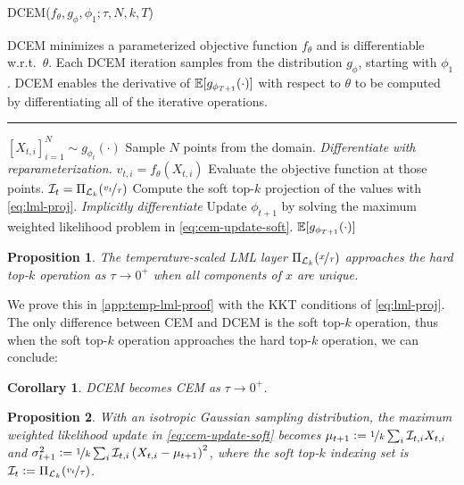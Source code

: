 \documentclass{article}
\newtheorem{proposition}{Proposition}
\newtheorem{corollary}{Corollary}
\newcommand{\LML}{\ensuremath{\mathcal{L}}}
\begin{document}
\begin{algorithm*}[t]
  \caption{DCEM($f_\theta, g_\phi, \phi_1; \tau, N, k, T$)}
\label{alg:dcem}
\begin{algorithmic}
  \State DCEM minimizes a parameterized objective function $f_\theta$
  and is differentiable w.r.t.~$\theta$.
  Each DCEM iteration samples from the distribution $g_\phi$,
  starting with $\phi_1$.
  DCEM enables the derivative of $\mathbb{E}[g_{\phi_{T+1}}(\cdot)]$
  with respect to $\theta$ to be computed by differentiating
  all of the iterative operations.
  \vspace{1mm}\hrule\vspace{1mm}
  \State $\left[X_{t,i}\right]_{i=1}^N \sim g_{\phi_t}(\cdot)$
  \Comment Sample $N$ points from the domain. \emph{Differentiate with reparameterization.}
  \State $v_{t,i}=f_\theta(X_{t,i})$
  \Comment Evaluate the objective function at those points.
  \State $\gI_t = \Pi_{\LML_k}(\nicefrac{v_t}{\tau})$
  \Comment Compute the soft top-$k$ projection of the values with \cref{eq:lml-proj}. \emph{Implicitly differentiate}
  \State Update $\phi_{t+1}$ by solving the maximum weighted likelihood problem in \cref{eq:cem-update-soft}.
  \EndFor
  \State \Return $\mathbb{E}[g_{\phi_{T+1}}(\cdot)]$
\end{algorithmic}
\end{algorithm*}

\begin{proposition}
  The temperature-scaled LML layer $\Pi_{\LML_k}(\nicefrac{x}{\tau})$
  approaches the hard top-$k$ operation as $\tau\rightarrow 0^+$
  when all components of $x$ are unique.
  \label{prop:temp-lml}
\end{proposition}

We prove this in \cref{app:temp-lml-proof} with
the KKT conditions of \cref{eq:lml-proj}.
The only difference between CEM and DCEM is the soft top-$k$
operation, thus when the soft top-$k$ operation approaches
the hard top-$k$ operation, we can conclude:

\begin{corollary}
  DCEM becomes CEM as $\tau\rightarrow 0^+$.
\end{corollary}

\begin{proposition}
  With an isotropic Gaussian sampling distribution, the
  maximum weighted likelihood update in
  \cref{eq:cem-update-soft} becomes
  $\mu_{t+1}\vcentcolon= \nicefrac{1}{k} \sum_i {\mathcal{I}}_{t,i} X_{t,i}$
  and $\sigma^2_{t+1}\vcentcolon= \nicefrac{1}{k} \sum_{i} {\mathcal{I}}_{t,i} \left(X_{t,i}-\mu_{t+1}\right)^2$,
  where the soft top-$k$ indexing set is
  $\gI_t \defeq \Pi_{\LML_k}(\nicefrac{v_t}{\tau})$.
  \label{prop:cem-wle}
\end{proposition}
\end{document}
